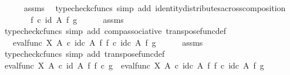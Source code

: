 \begin{isabellebody}
\ \ \ \ \isamarkupfalse%
\ assms\ \isamarkupfalse%
\ {\isacharparenleft}{\kern0pt}typecheck{\isacharunderscore}{\kern0pt}cfuncs{\isacharcomma}{\kern0pt}\ simp\ add{\isacharcolon}{\kern0pt}\ identity{\isacharunderscore}{\kern0pt}distributes{\isacharunderscore}{\kern0pt}across{\isacharunderscore}{\kern0pt}composition{\isacharparenright}{\kern0pt}\isanewline
\ \ \isamarkupfalse%
\ \isamarkupfalse%
\ {\isachardoublequoteopen}{\isachardot}{\kern0pt}{\isachardot}{\kern0pt}{\isachardot}{\kern0pt}\ {\isacharequal}{\kern0pt}\ f\ {\isasymcirc}\isactrlsub c\ {\isacharparenleft}{\kern0pt}id\ A\ {\isasymtimes}\isactrlsub f\ g{\isacharparenright}{\kern0pt}{\isachardoublequoteclose}\isanewline
\ \ \ \ \isamarkupfalse%
\ assms\ \isamarkupfalse%
\ {\isacharparenleft}{\kern0pt}typecheck{\isacharunderscore}{\kern0pt}cfuncs{\isacharcomma}{\kern0pt}\ simp\ add{\isacharcolon}{\kern0pt}\ comp{\isacharunderscore}{\kern0pt}associative{}\ transpose{\isacharunderscore}{\kern0pt}func{\isacharunderscore}{\kern0pt}def{\isacharparenright}{\kern0pt}\isanewline
\ \ \isamarkupfalse%
\ \isamarkupfalse%
\ {\isachardoublequoteopen}{\isachardot}{\kern0pt}{\isachardot}{\kern0pt}{\isachardot}{\kern0pt}\ {\isacharequal}{\kern0pt}\ eval{\isacharunderscore}{\kern0pt}func\ X\ A\ {\isasymcirc}\isactrlsub c\ {\isacharparenleft}{\kern0pt}id\isactrlsub c\ A\ {\isasymtimes}\isactrlsub f\ {\isacharparenleft}{\kern0pt}f\ {\isasymcirc}\isactrlsub c\ {\isacharparenleft}{\kern0pt}id\isactrlsub c\ A\ {\isasymtimes}\isactrlsub f\ g{\isacharparenright}{\kern0pt}{\isacharparenright}{\kern0pt}\isactrlsup {\isasymsharp}{\isacharparenright}{\kern0pt}{\isachardoublequoteclose}\isanewline
\ \ \ \ \isamarkupfalse%
\ assms\ \isamarkupfalse%
\ {\isacharparenleft}{\kern0pt}typecheck{\isacharunderscore}{\kern0pt}cfuncs{\isacharcomma}{\kern0pt}\ simp\ add{\isacharcolon}{\kern0pt}\ transpose{\isacharunderscore}{\kern0pt}func{\isacharunderscore}{\kern0pt}def{\isacharparenright}{\kern0pt}\isanewline
\ \ \isamarkupfalse%
\ \isamarkupfalse%
\ {\isachardoublequoteopen}eval{\isacharunderscore}{\kern0pt}func\ X\ A\ {\isasymcirc}\isactrlsub c\ {\isacharparenleft}{\kern0pt}id\ A\ {\isasymtimes}\isactrlsub f\ {\isacharparenleft}{\kern0pt}f\isactrlsup {\isasymsharp}\ {\isasymcirc}\isactrlsub c\ g{\isacharparenright}{\kern0pt}{\isacharparenright}{\kern0pt}\ {\isacharequal}{\kern0pt}\ eval{\isacharunderscore}{\kern0pt}func\ X\ A\ {\isasymcirc}\isactrlsub c\ {\isacharparenleft}{\kern0pt}id\isactrlsub c\ A\ {\isasymtimes}\isactrlsub f\ {\isacharparenleft}{\kern0pt}f\ {\isasymcirc}\isactrlsub c\ {\isacharparenleft}{\kern0pt}id\isactrlsub c\ A\ {\isasymtimes}\isactrlsub f\ g{\isacharparenright}{\kern0pt}{\isacharparenright}{\kern0pt}\isactrlsup {\isasymsharp}{\isacharparenright}{\kern0pt}{\isachardoublequoteclose}\isanewline

\end{isabellebody}
